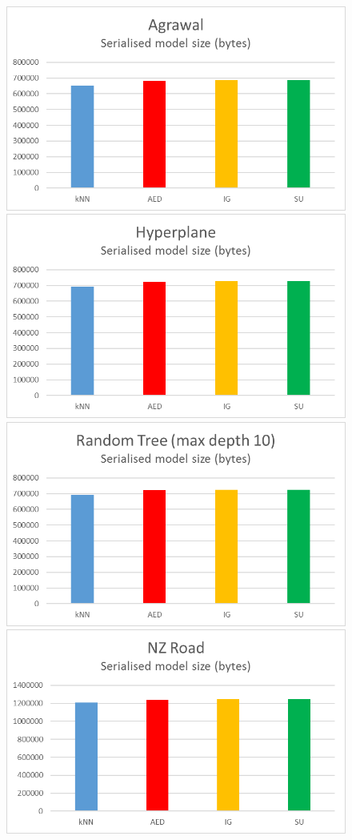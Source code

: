 \begin{figure}[hp]
\includegraphics[scale=0.17]{Graphs/Agrawal/bytes}
\includegraphics[scale=0.17]{Graphs/Hyperplane/bytes}
\includegraphics[scale=0.17]{Graphs/TreeD10/bytes}
\includegraphics[scale=0.17]{Graphs/NZRoad/bytes}

\end{figure}
